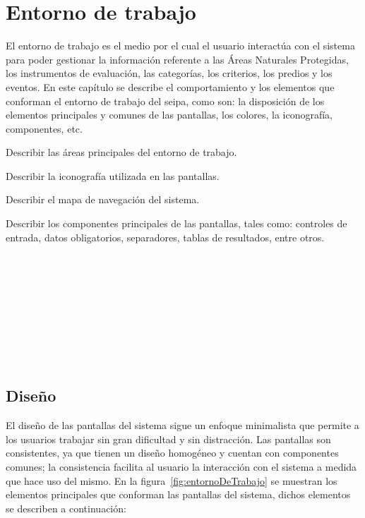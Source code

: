 
\section{Entorno de trabajo}

    El entorno de trabajo es el medio por el cual el usuario interactúa con el sistema para poder gestionar la información 
    referente a las Áreas Naturales Protegidas, los instrumentos de evaluación, las categorías, los criterios, los predios y los eventos. En este capítulo se describe el comportamiento y los elementos que conforman el entorno de 
    trabajo del seipa, como son: la disposición de los elementos principales y comunes de las pantallas, los colores, la iconografía, componentes, etc. \bigskip

    \begin{objetivos}
      \item Describir las áreas principales del entorno de trabajo.
      \item Describir la iconografía utilizada en las pantallas.
      \item Describir el mapa de navegación del sistema.
      \item Describir los componentes principales de las pantallas, tales como: controles de entrada, datos obligatorios, separadores, tablas de resultados, entre otros.
    \end{objetivos}
\\\\\\\\\\\\\\\\

\subsection{Diseño}

  El diseño de las pantallas del sistema sigue un enfoque minimalista que permite a los usuarios trabajar sin gran dificultad y sin distracción. 
  Las pantallas son consistentes, ya que tienen un diseño homogéneo y cuentan con componentes comunes; la consistencia facilita al usuario la interacción
  con el sistema a medida que hace uso del mismo. En la figura~\ref{fig:entornoDeTrabajo} se muestran los elementos principales que conforman las pantallas del sistema, 
  dichos elementos se describen a continuación:

